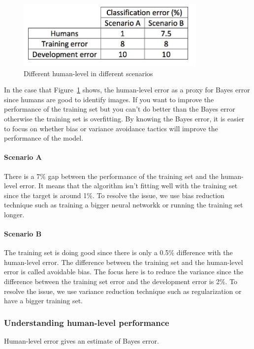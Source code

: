 \documentclass[UTF8]{article}
\begin{document}
\begin{figure}[htb]
    \centering
    \includegraphics[width=25em]{figures/avoidable-bias}
    \caption{Different human-level in different scenarios}
    \label{figures/avoidable-bias}
\end{figure}

In the case that Figure~\ref{figures/avoidable-bias} shows, the human-level error as a proxy for
Bayes error since humans are good to identify images. If you want to improve the performance of the
training set but you can't do better than the Bayes error otherwise the training set is overfitting.
By knowing the Bayes error, it is easier to focus on whether bias or variance avoidance tactics
will improve the performance of the model.

\paragraph{Scenario A}
There is a 7\% gap between the performance of the training set and the human-level error. It means
that the algorithm isn't fitting well with the training set since the target is around 1\%. To
resolve the issue, we use bias reduction technique such as training a bigger neural networkk or
running the training set longer.

\paragraph{Scenario B}
The training set is doing good since there is only a 0.5\% difference with the human-level error.
The difference between the training set and the human-level error is called avoidable bias. The
focus here is to reduce the variance since the difference between the training set error and the
development error is 2\%. To resolve the issue, we use variance reduction technique such as
regularization or have a bigger training set.

\subsubsection{Understanding human-level performance}
Human-level error gives an estimate of Bayes error.
\end{document}
